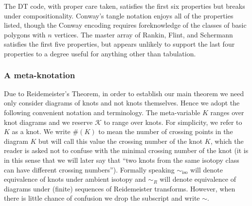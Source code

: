 The DT code, with proper care taken, satisfies the
first six properties but breaks under compositionality. Conway's
tangle notation enjoys all of the properties listed, though the Conway
encoding requires foreknowledge of the classes of basic polygons with
$n$ vertices. The master array of Rankin, Flint, and Schermann 
satisfies the first five properties, but appears unlikely to support
the last four properties to a degree useful for anything other than
tabulation.

\subsubsection{A meta-knotation}

 Due to Reidemeister's Theorem, in order to establish our main theorem we need only consider diagrams of knots and not knots themselves. Hence we  adopt the following convenient
notation and terminology. The meta-variable  $K$
ranges over knot diagrams and we reserve $\mathcal{K}$ to range over knots. For simplicity, we refer to $K$ as a knot. We write $\#(K)$ to mean the number of crossing points in the diagram $K$ but will call this value the crossing number of the knot $K$, which the reader is asked not to confuse with the minimal crossing number of the knot (it is in this sense that we will later say that ``two knots from the same isotopy class can have different crossing numbers'').   Formally speaking $\sim_{\text{iso}}$ will denote  equivalence of knots under ambient
isotopy and $\sim_{R}$ will denote equivalence of diagrams under (finite) sequences of
Reidemeister transforms. However, when there is little chance of confusion we
drop the subscript and write $\sim$.  


